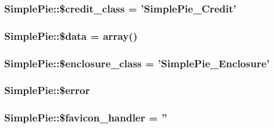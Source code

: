 \hypertarget{class_simple_pie_a47004e6ac04e56486b40d45072f423f7}{
\subsubsection[{\$credit\-\_\-class}]{\setlength{\rightskip}{0pt plus 5cm}Simple\-Pie\-::\$credit\-\_\-class = '{\bf Simple\-Pie\-\_\-\-Credit}'}}\label{class_simple_pie_a47004e6ac04e56486b40d45072f423f7}
\hypertarget{class_simple_pie_a6422da00e8fb85195da75105b021cdab}{
\subsubsection[{\$data}]{\setlength{\rightskip}{0pt plus 5cm}Simple\-Pie\-::\$data = array()}}\label{class_simple_pie_a6422da00e8fb85195da75105b021cdab}
\hypertarget{class_simple_pie_af715ec79332822090e78b66ca7974013}{
\subsubsection[{\$enclosure\-\_\-class}]{\setlength{\rightskip}{0pt plus 5cm}Simple\-Pie\-::\$enclosure\-\_\-class = '{\bf Simple\-Pie\-\_\-\-Enclosure}'}}\label{class_simple_pie_af715ec79332822090e78b66ca7974013}
\hypertarget{class_simple_pie_a4a21bcbc3310a990b5dd0d5d1b50038a}{
\subsubsection[{\$error}]{\setlength{\rightskip}{0pt plus 5cm}Simple\-Pie\-::\$error}}\label{class_simple_pie_a4a21bcbc3310a990b5dd0d5d1b50038a}
\hypertarget{class_simple_pie_a26c2235fde0b5b0f0f93bbd09c471818}{
\subsubsection[{\$favicon\-\_\-handler}]{\setlength{\rightskip}{0pt plus 5cm}Simple\-Pie\-::\$favicon\-\_\-handler = ''}}\label{class_simple_pie_a26c2235fde0b5b0f0f93bbd09c471818}
